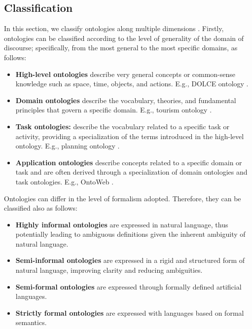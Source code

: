 \subsection{Classification}
In this section, we classify ontologies along multiple dimensions \cite{canfora2004ontologie}.
Firstly, ontologies can be classified according to the level of generality of the domain of discourse; specifically, from the most general to the most specific domains, as follows:
\begin{itemize}
    \item \textbf{High-level ontologies} describe very general concepts or common-sense knowledge such as space, time, objects, and actions. E.g., DOLCE ontology \cite{borgo2022dolce}.
    \item \textbf{Domain ontologies} describe the vocabulary, theories, and fundamental principles that govern a specific domain. E.g., tourism ontology \cite{tourismOntology2013}.
    \item \textbf{Task ontologies:} describe the vocabulary related to a specific task or activity, providing a specialization of the terms introduced in the high-level ontology. E.g., planning ontology \cite{taskOntologyPlanning}.
    \item \textbf{Application ontologies} describe concepts related to a specific domain or task and are often derived through a specialization of domain ontologies and task ontologies. E.g., OntoWeb \cite{ontoweb2002}.
\end{itemize}

Ontologies can differ in the level of formalism adopted. Therefore, they can be classified also as follows:
\begin{itemize}
    \item \textbf{Highly informal ontologies} are expressed in natural language, thus potentially leading to ambiguous definitions given the inherent ambiguity of natural language.
    \item \textbf{Semi-informal ontologies} are expressed in a rigid and structured form of natural language, improving clarity and reducing ambiguities.
    \item \textbf{Semi-formal ontologies} are expressed through formally defined artificial languages.
    \item \textbf{Strictly formal ontologies} are expressed with languages based on formal semantics.
\end{itemize}

